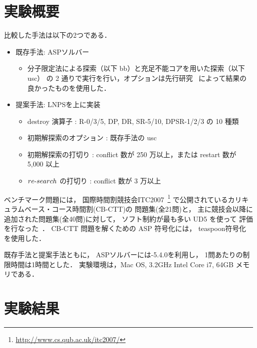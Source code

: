 \section{実験概要}
比較した手法は以下の2つである．
\begin{itemize}\compress
\item 既存手法: ASPソルバー{\clingo}
 \begin{itemize}
  \item 分子限定法による探索（以下 bb）と充足不能コアを用いた探索（以下 usc）
  の 2 通りで実行を行い，オプションは先行研究~\cite{anor/Banbara2019}
  によって結果の良かったものを使用した．
 \end{itemize}
\item 提案手法: LNPSを{\clingo}上に実装
 \begin{itemize}
  \item destroy 演算子 : R-0/3/5, DP, DR, SR-5/10, DPSR-1/2/3 の 10 種類
  \item 初期解探索のオプション : 既存手法の usc
  \item 初期解探索の打切り : conflict 数が 250 万以上，または restart 数が 5,000 以上
  \item $re\mathchar`-search$ の打切り : conflict 数が 3 万以上
 \end{itemize}
\end{itemize}

ベンチマーク問題には，
国際時間割競技会ITC2007~\footnote{%
  \url{http://www.cs.qub.ac.uk/itc2007/}}
で公開されているカリキュラムベース・コース時間割(CB-CTT)の
問題集(全21問)と，
主に競技会以降に追加された問題集(全40問)に対して，
ソフト制約が最も多い UD5 を使って
評価を行なった~\cite{GasperoMS/ITC2007,DBLP:journals/anor/BonuttiCGS12}．
CB-CTT 問題を解くための ASP 符号化には，
\textsf{teaspoon}符号化~\cite{anor/Banbara2019}
を使用した．
%

既存手法と提案手法ともに，
ASPソルバーには{\clingo}-5.4.0を利用し，
1問あたりの制限時間は1時間とした．
実験環境は，Mac OS, 3.2GHz Intel Core i7, 64GB メモリである．

\section{実験結果}

